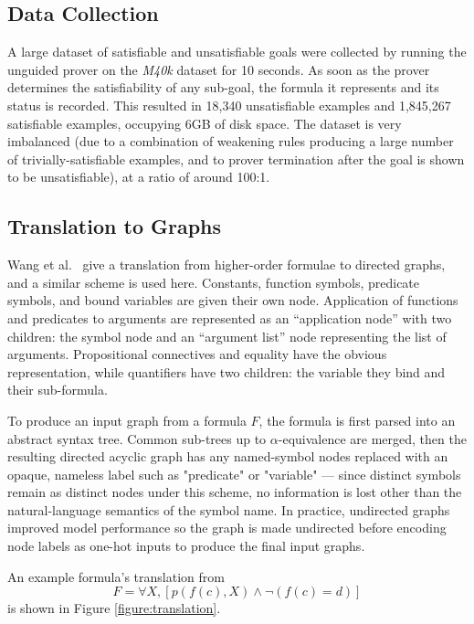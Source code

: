 \documentclass[runningheads]{llncs}
\newcommand{\mizarlarge}{\textit{M40k}}
\begin{document}
\subsection{Data Collection}
A large dataset of satisfiable and unsatisfiable goals were collected by running the unguided prover on the \mizarlarge{} dataset for 10 seconds.
As soon as the prover determines the satisfiability of any sub-goal, the formula it represents and its status is recorded.
This resulted in 18,340 unsatisfiable examples and 1,845,267 satisfiable examples, occupying 6GB of disk space.
The dataset is very imbalanced (due to a combination of weakening rules producing a large number of trivially-satisfiable examples, and to prover termination after the goal is shown to be unsatisfiable), at a ratio of around 100:1.

\subsection{Translation to Graphs}
Wang et al.~\cite{formula-graph} give a translation from higher-order formulae to directed graphs, and a similar scheme is used here.
Constants, function symbols, predicate symbols, and bound variables are given their own node.
Application of functions and predicates to arguments are represented as an ``application node'' with two children: the symbol node and an ``argument list'' node representing the list of arguments.
Propositional connectives and equality have the obvious representation, while quantifiers have two children: the variable they bind and their sub-formula.

To produce an input graph from a formula \(F\), the formula is first parsed into an abstract syntax tree.
Common sub-trees up to \(\alpha\)-equivalence are merged, then the resulting directed acyclic graph has any named-symbol nodes replaced with an opaque, nameless label such as "predicate" or "variable" --- since distinct symbols remain as distinct nodes under this scheme, no information is lost other than the natural-language semantics of the symbol name.
In practice, undirected graphs improved model performance so the graph is made undirected before encoding node labels as one-hot inputs to produce the final input graphs.

An example formula's translation from
\[
	F = \forall X, \left[p\left(f(c), X\right) \wedge \lnot\left(f(c) = d\right)\right]
\]
is shown in Figure \ref{figure:translation}.
\end{document}
